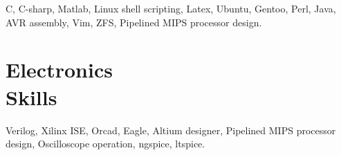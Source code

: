 \documentclass[margin,line]{resume}
\begin{document}
\begin{resume}
    C, C-sharp, Matlab, Linux shell scripting, Latex, Ubuntu, Gentoo, Perl, Java,\\
    AVR assembly, Vim, ZFS, Pipelined MIPS processor design.\\

    \section{\mysidestyle Electronics\\Skills} 

    Verilog, Xilinx ISE, Orcad, Eagle, Altium designer, Pipelined MIPS processor\\
    design, Oscilloscope operation, ngspice, ltspice.\\




\end{resume}
\end{document}
